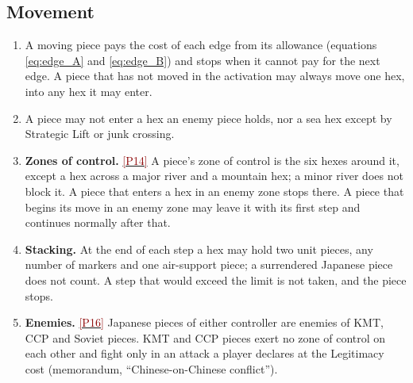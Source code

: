 \documentclass[11pt]{article}
\newcommand{\ptest}[1]{\hyperlink{ptest}{\textcolor{darkred}{[P#1]}}}
\begin{document}
\subsection{Movement}\label{sub:move}
\begin{enumerate}
\item A moving piece pays the cost of each edge from its allowance (equations \eqref{eq:edge_A} and \eqref{eq:edge_B}) and stops when it cannot pay for the next edge. A piece that has not moved in the activation may always move one hex, into any hex it may enter.
\item A piece may not enter a hex an enemy piece holds, nor a sea hex except by Strategic Lift or junk crossing.
\item \textbf{Zones of control.} \ptest{14} A piece's zone of control is the six hexes around it, except a hex across a major river and a mountain hex; a minor river does not block it. A piece that enters a hex in an enemy zone stops there. A piece that begins its move in an enemy zone may leave it with its first step and continues normally after that.
\item \textbf{Stacking.} At the end of each step a hex may hold two unit pieces, any number of markers and one air-support piece; a surrendered Japanese piece does not count. A step that would exceed the limit is not taken, and the piece stops.
\item \textbf{Enemies.} \ptest{16} Japanese pieces of either controller are enemies of KMT, CCP and Soviet pieces. KMT and CCP pieces exert no zone of control on each other and fight only in an attack a player declares at the Legitimacy cost (memorandum, ``Chinese-on-Chinese conflict'').
\end{enumerate}
\end{document}
